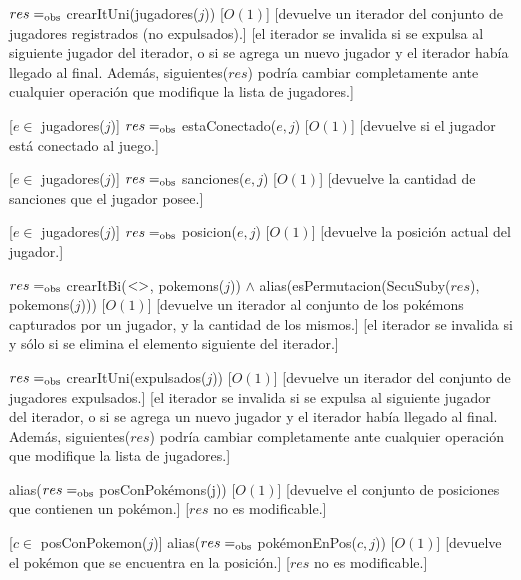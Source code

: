 \begin{Interfaz}
	{$res =_{\mathrm{obs}}$ crearItUni(jugadores($j$))}
	[$O(1)$]
	[devuelve un iterador del conjunto de jugadores registrados (no expulsados).]
	[el iterador se invalida si se expulsa al siguiente jugador del iterador, o si se agrega un nuevo jugador y el iterador había llegado al final. Además, siguientes($res$) podría cambiar completamente ante cualquier operación que modifique la lista de jugadores.]

	[$e \in$ jugadores($j$)]
	{$res =_{\mathrm{obs}}$ estaConectado($e, j$)}
	[$O(1)$]
	[devuelve si el jugador está conectado al juego.]

	[$e \in$ jugadores($j$)]
	{$res =_{\mathrm{obs}}$ sanciones($e, j$)}
	[$O(1)$]
	[devuelve la cantidad de sanciones que el jugador posee.]

	[$e \in$ jugadores($j$)]
	{$res =_{\mathrm{obs}}$ posicion($e, j$)}
	[$O(1)$]
	[devuelve la posición actual del jugador.]

	{$res =_{\mathrm{obs}}$ crearItBi($<>$, pokemons($j$)) $\land$ alias(esPermutacion(SecuSuby($res$), pokemons($j$)))}
	[$O(1)$]
	[devuelve un iterador al conjunto de los pokémons capturados por un jugador, y la cantidad de los mismos.]
	[el iterador se invalida si y sólo si se elimina el elemento siguiente del iterador.]

	{$res =_{\mathrm{obs}}$ crearItUni(expulsados($j$))}
	[$O(1)$]
	[devuelve un iterador del conjunto de jugadores expulsados.]
	[el iterador se invalida si se expulsa al siguiente jugador del iterador, o si se agrega un nuevo jugador y el iterador había llegado al final. Además, siguientes($res$) podría cambiar completamente ante cualquier operación que modifique la lista de jugadores.]

	{alias($res =_{\mathrm{obs}}$ posConPokémons(j))}
	[$O(1)$]
	[devuelve el conjunto de posiciones que contienen un pokémon.]
	[$res$ no es modificable.]

	[$c \in$ posConPokemon($j$)]
	{alias($res =_{\mathrm{obs}}$ pokémonEnPos($c,j$))}
	[$O(1)$]
	[devuelve el pokémon que se encuentra en la posición.]
	[$res$ no es modificable.]


\end{Interfaz}

